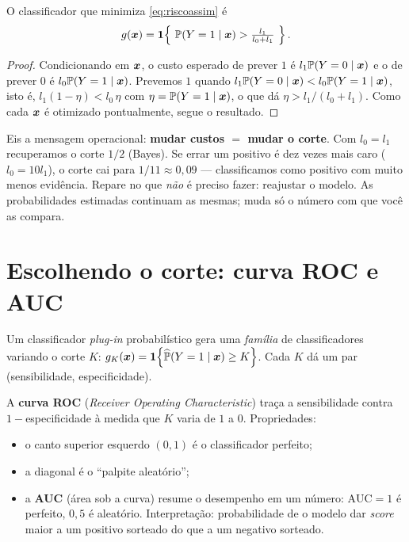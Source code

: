 \documentclass[11pt,a4paper]{article}
\begin{document}
\begin{proposicao}\label{prop:corte}
O classificador que minimiza \eqref{eq:riscoassim} é
\[
  g(\bm{x}) = \mathbf{1}\!\left\{\ \mathbb{P}(Y=1\mid\bm{x}) > \tfrac{l_1}{l_0+l_1}\ \right\}.
\]
\end{proposicao}
\begin{proof}
Condicionando em $\bm{x}$, o custo esperado de prever $1$ é $l_1\mathbb{P}(Y=0\mid\bm{x})$ e o de
prever $0$ é $l_0\mathbb{P}(Y=1\mid\bm{x})$. Prevemos $1$ quando
$l_1\mathbb{P}(Y=0\mid\bm{x}) < l_0\mathbb{P}(Y=1\mid\bm{x})$, isto é,
$l_1(1-\eta) < l_0\,\eta$ com $\eta=\mathbb{P}(Y=1\mid\bm{x})$, o que dá
$\eta > l_1/(l_0+l_1)$. Como cada $\bm{x}$ é otimizado pontualmente, segue o resultado.
\end{proof}

\begin{ideia}
Eis a mensagem operacional: \textbf{mudar custos $=$ mudar o corte}. Com $l_0=l_1$
recuperamos o corte $1/2$ (Bayes). Se errar um positivo é dez vezes mais caro
($l_0=10 l_1$), o corte cai para $1/11\approx 0{,}09$ --- classificamos como
positivo com muito menos evidência. Repare no que \emph{não} é preciso fazer:
reajustar o modelo. As probabilidades estimadas continuam as mesmas; muda só o
número com que você as compara.
\end{ideia}

\section{Escolhendo o corte: curva ROC e AUC}
Um classificador \emph{plug-in} probabilístico gera uma \emph{família} de
classificadores variando o corte $K$: $g_K(\bm{x})=\mathbf{1}\!\left\{\widehat{\mathbb{P}}(Y=1\mid\bm{x})\ge K\right\}$.
Cada $K$ dá um par (sensibilidade, especificidade).

A \textbf{curva ROC} (\emph{Receiver Operating Characteristic}) traça a
sensibilidade contra $1-$especificidade à medida que $K$ varia de $1$ a $0$.
Propriedades:
\begin{itemize}[leftmargin=1.4cm,nosep]
  \item o canto superior esquerdo $(0,1)$ é o classificador perfeito;
  \item a diagonal é o ``palpite aleatório'';
  \item a \textbf{AUC} (área sob a curva) resume o desempenho em um número:
        $\text{AUC}=1$ é perfeito, $0{,}5$ é aleatório. Interpretação:
        probabilidade de o modelo dar \emph{score} maior a um positivo sorteado do
        que a um negativo sorteado.
\end{itemize}
\end{document}
